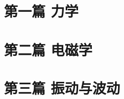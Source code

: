 \documentclass[12pt,a4paper,oneside]{report}
\numberwithin{equation}{section}
\begin{document}

\clearpage
\thispagestyle{fancy}
\tableofcontents
\clearpage
\part{第一篇 力学}





\part{第二篇 电磁学}



\part{第三篇 振动与波动}


\end{document}
